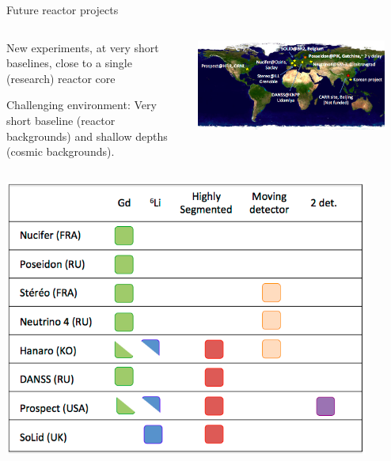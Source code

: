 \begin{frame}[t]{Future reactor projects}
\centering
\begin{columns}
  \begin{column}{0.50\textwidth}
    \begin{itemize}
     {\scriptsize
      \item New experiments, at very short baselines, close to a single (research) reactor core
      \item Challenging environment:
               Very short baseline (reactor backgrounds) and shallow
               depths (cosmic backgrounds).\\
    }
    \end{itemize}
  \end{column}
  \begin{column}{0.50\textwidth}
     \includegraphics[width=0.90\textwidth]{./images/beyond3nu/future/vsbn_reactor_map.png}
  \end{column}
\end{columns}
\begin{columns}[t]
  \begin{column}{0.50\textwidth}
     \includegraphics[width=0.90\textwidth]{./images/beyond3nu/future/vsbn_reactor_tab1.png}

\end{column}
\end{columns}
\end{frame}
